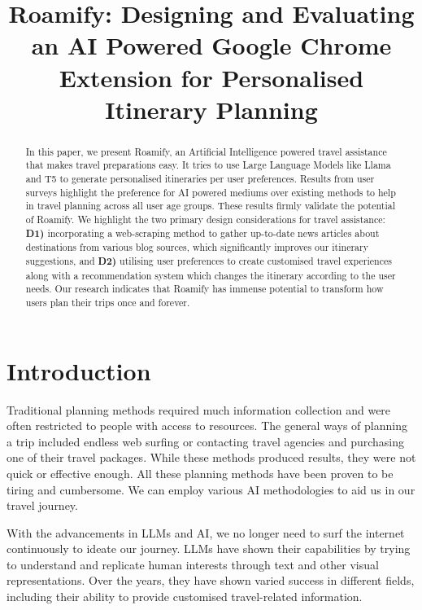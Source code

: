 \documentclass[manuscript,review,anonymous]{acmart}
\title{Roamify: Designing and Evaluating an AI Powered Google Chrome Extension for Personalised Itinerary Planning}
\begin{document}
\begin{abstract}
    In this paper, we present Roamify, an Artificial Intelligence powered travel assistance that makes travel preparations easy. It tries to use Large Language Models like Llama and T5 to generate personalised itineraries per user preferences. Results from user surveys highlight the preference for AI powered mediums over existing methods to help in travel planning across all user age groups. These results firmly validate the potential of Roamify. We highlight the two primary design considerations for travel assistance: \textbf{D1)} incorporating a web-scraping method to gather up-to-date news articles about  destinations from various blog sources, which significantly improves our itinerary suggestions, and \textbf{D2)} utilising user preferences to create customised travel experiences along with a recommendation system which changes the itinerary according to the user needs. Our research indicates that Roamify has immense potential to transform how users plan their trips once and forever.
\end{abstract}



\maketitle

\section{Introduction}
    Traditional planning methods required much information collection and were often restricted to people with access to resources. The general ways of planning a trip included endless web surfing or contacting travel agencies and purchasing one of their travel packages. While these methods produced results, they were not quick or effective enough. All these planning methods have been proven to be tiring and cumbersome. We can employ various AI methodologies to aid us in our travel journey\cite{intro1}.
    
    With the advancements in LLMs and AI, we no longer need to surf the internet continuously to ideate our journey. LLMs have shown their capabilities by trying to understand and replicate human interests through text and other visual representations\cite{intro2}. Over the years, they have shown varied success in different fields, including their ability to provide customised travel-related information.
    
\end{document}
